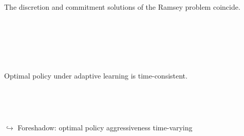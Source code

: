 \documentclass[10pt]{beamer}
\newcommand{\backupend}{
   \addtocounter{framenumberappendix}{-\value{framenumber}}
   \addtocounter{framenumber}{\value{framenumberappendix}} 
}
\begin{document}
\begin{frame}
	\frametitle{}
	\label{no_commitment}

\begin{lemma} The discretion and commitment solutions of the Ramsey problem coincide. 
\end{lemma}

\

\hfill \hyperlink{no_commitment_intuition}{}

\

\

\begin{corollary} Optimal policy under adaptive learning is time-consistent. 
\end{corollary}


\

\

$\hookrightarrow $ Foreshadow: optimal policy aggressiveness time-varying

\vfill




\end{frame}



%
%

\backupend
\end{document}
